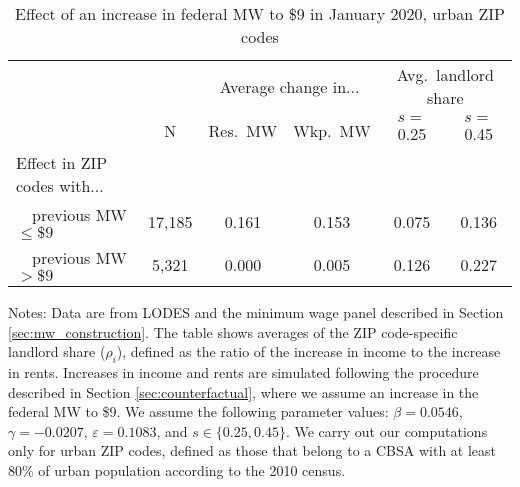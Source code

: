 \begin{table}[hbt!]
    \centering
    \caption{Effect of an increase in federal MW to \$9 in January 2020, urban ZIP codes}
    \label{tab:counterfactuals_fed_9usd}

    \begin{tabular}{@{}lccccc@{}}
        \toprule
                            &   & \multicolumn{2}{c}{Average change in...}
                                & \multicolumn{2}{c}{Avg.\ landlord share}       \\ \cmidrule(lr){3-4}\cmidrule(lr){5-6}
                            & N & Res.\ MW & Wkp.\ MW
                            & $s = $ 0.25  & $s = $ 0.45                           \\ \midrule
        Effect in ZIP codes with...          &      &       &       &     &      \\
        $\quad$previous MW $\leq\$9\quad$    & 17,185 &  0.161 & 0.153  & 0.075 &  0.136   \\
        $\quad$previous MW $>\$9\quad$       & 5,321 &  0.000 & 0.005  & 0.126 & 0.227    \\ \bottomrule
    \end{tabular}
    
    \begin{minipage}{.95\textwidth} \footnotesize
        \vspace{2mm}
        Notes: 
        Data are from LODES and the minimum wage panel described in Section 
        \ref{sec:mw_construction}.
        The table shows averages of the ZIP code-specific landlord share ($\rho_i$),
        defined as the ratio of the increase in income to the increase in rents.
        Increases in income and rents are simulated following the procedure
        described in Section \ref{sec:counterfactual}, where we assume 
        an increase in the federal MW to \$9.
        We assume the following parameter values: 
        $\beta = 0.0546$, $\gamma = -0.0207$, $\varepsilon = 0.1083$, and 
        $s\in\{0.25, 0.45\}$.
        We carry out our computations only for urban ZIP codes, defined as 
        those that belong to a CBSA with at least 80\% of urban population
        according to the 2010 census.
    \end{minipage}
\end{table}